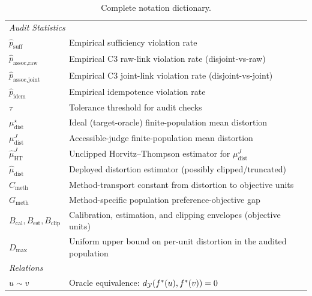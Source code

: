 \begin{table}[htbp]
\begin{tabular}{ll}
\midrule
\multicolumn{2}{l}{\textit{Audit Statistics}} \\
$\hat{p}_{\text{suff}}$ & Empirical sufficiency violation rate \\
$\hat{p}_{\text{assoc,raw}}$ & Empirical C3 raw-link violation rate (disjoint-vs-raw) \\
$\hat{p}_{\text{assoc,joint}}$ & Empirical C3 joint-link violation rate (disjoint-vs-joint) \\
$\hat{p}_{\text{idem}}$ & Empirical idempotence violation rate \\
$\tau$ & Tolerance threshold for audit checks \\
$\mu_{\mathrm{dist}}^{\star}$ & Ideal (target-oracle) finite-population mean distortion \\
$\mu_{\mathrm{dist}}^{J}$ & Accessible-judge finite-population mean distortion \\
$\hat{\mu}_{\mathrm{HT}}^{J}$ & Unclipped Horvitz--Thompson estimator for $\mu_{\mathrm{dist}}^{J}$ \\
$\hat{\mu}_{\mathrm{dist}}$ & Deployed distortion estimator (possibly clipped/truncated) \\
$C_{\mathrm{meth}}$ & Method-transport constant from distortion to objective units \\
$G_{\mathrm{meth}}$ & Method-specific population preference-objective gap \\
$B_{\mathrm{cal}}, B_{\mathrm{est}}, B_{\mathrm{clip}}$ & Calibration, estimation, and clipping envelopes (objective units) \\
$D_{\max}$ & Uniform upper bound on per-unit distortion in the audited population \\
\midrule
\multicolumn{2}{l}{\textit{Relations}} \\
$u \sim v$ & Oracle equivalence: $d_{\mathcal{Y}}(f^\ast(u), f^\ast(v)) = 0$ \\
\bottomrule
\end{tabular}
\caption{Complete notation dictionary.}
\end{table}

